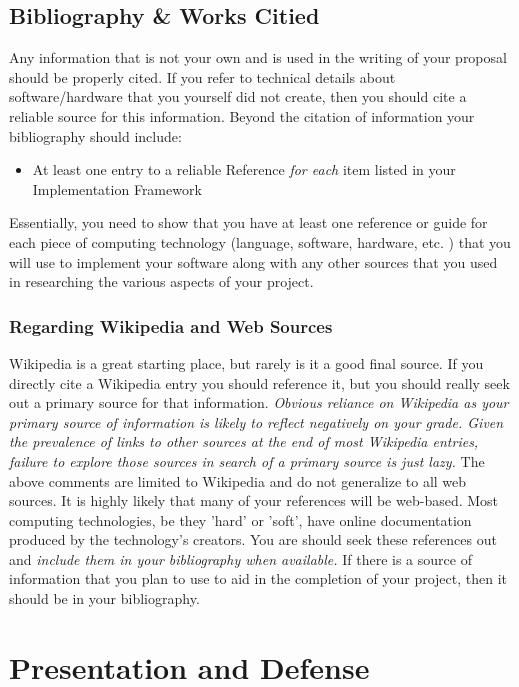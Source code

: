 \documentclass[10pt]{article}
\begin{document}
\subsection{Bibliography \& Works Citied}

Any information that is not your own and is used in the writing of your proposal should be properly cited.  If you refer to technical details about software/hardware that you yourself did not create, then you should cite a reliable source for this information.  Beyond the citation of information your bibliography should include:
\begin{itemize}
\item At least one entry to a reliable Reference \textit{for each} item listed in your Implementation Framework 
\end{itemize}
Essentially, you need to show that you have at least one reference or guide for each piece of computing technology (language, software, hardware, etc. ) that you will use to implement your software along with any other sources that you used in researching the various aspects of your project.

\subsubsection{ Regarding Wikipedia and Web Sources}
Wikipedia is a great starting place, but rarely is it a good final source.  If you directly cite a Wikipedia entry you should reference it, but you should really seek out a primary source for that information.  \textit{Obvious reliance on Wikipedia as your primary source of information is likely to reflect negatively on your grade.  Given the prevalence of links to other sources at the end of most Wikipedia entries, failure to explore those sources in search of a primary source is just lazy.}  The above comments are limited to Wikipedia and do not generalize to all web sources.
It is highly likely that many of your references will be web-based.  Most computing technologies, be they 'hard' or 'soft', have online documentation produced by the technology's creators.  You are should seek these references out and \textit{include them in your bibliography when available.}  If there is a source of information that you plan to use to aid in the completion of your project, then it should be in your bibliography.

\section{Presentation and Defense}
\end{document}
